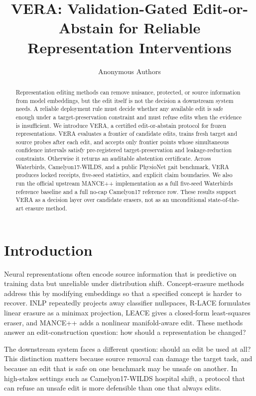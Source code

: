 \documentclass{article}
\title{VERA: Validation-Gated Edit-or-Abstain for Reliable Representation Interventions}
\author{Anonymous Authors}
\begin{document}
\sloppy
{}
\maketitle

\begin{abstract}
Representation editing methods can remove nuisance, protected, or source
information from model embeddings, but the edit itself is not the decision a
downstream system needs. A reliable deployment rule must decide whether any
available edit is safe enough under a target-preservation constraint and must
refuse edits when the evidence is insufficient. We introduce VERA, a certified
edit-or-abstain protocol for frozen representations. VERA evaluates a frontier
of candidate edits, trains fresh target and source probes after each edit, and
accepts only frontier points whose simultaneous confidence intervals satisfy
pre-registered target-preservation and leakage-reduction constraints. Otherwise
it returns an auditable abstention certificate. Across Waterbirds,
Camelyon17-WILDS, and a public PhysioNet gait benchmark, VERA produces locked
receipts, five-seed statistics, and explicit claim boundaries. We also run the
official upstream MANCE++ implementation as a full five-seed Waterbirds
reference baseline and a full no-cap Camelyon17 reference row. These results
support VERA as a decision layer over candidate erasers, not as an
unconditional state-of-the-art erasure method.
\end{abstract}

\section{Introduction}

Neural representations often encode source information that is predictive on
training data but unreliable under distribution shift. Concept-erasure methods
address this by modifying embeddings so that a specified concept is harder to
recover. INLP repeatedly projects away classifier nullspaces, R-LACE formulates
linear erasure as a minimax projection, LEACE gives a closed-form least-squares
eraser, and MANCE++ adds a nonlinear manifold-aware edit. These methods answer
an edit-construction question: how should a representation be changed?

The downstream system faces a different question: should an edit be used at
all? This distinction matters because source removal can damage the target
task, and because an edit that is safe on one benchmark may be unsafe on
another. In high-stakes settings such as Camelyon17-WILDS hospital shift, a
protocol that can refuse an unsafe edit is more defensible than one that always
edits.
\end{document}
